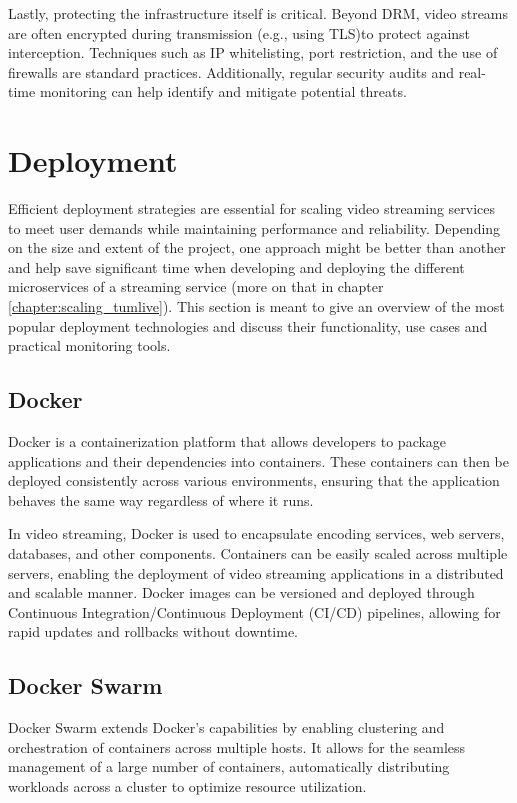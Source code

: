 Lastly, protecting the infrastructure itself is critical. Beyond DRM, video streams are often encrypted during transmission (e.g., using \ac{TLS})to protect against interception. Techniques such as IP whitelisting, port restriction, and the use of firewalls are standard practices. Additionally, regular security audits and real-time monitoring can help identify and mitigate potential threats\cite{network_security}.

\section{Deployment}
Efficient deployment strategies are essential for scaling video streaming services to meet user demands while maintaining performance and reliability. Depending on the size and extent of the project, one approach might be better than another and help save significant time when developing and deploying the different microservices of a streaming service (more on that in chapter \ref{chapter:scaling_tumlive}). This section is meant to give an overview of the most popular deployment technologies and discuss their functionality, use cases and practical monitoring tools.

\subsection{Docker}
Docker is a containerization platform that allows developers to package applications and their dependencies into containers. These containers can then be deployed consistently across various environments, ensuring that the application behaves the same way regardless of where it runs.

In video streaming, Docker is used to encapsulate encoding services, web servers, databases, and other components. Containers can be easily scaled across multiple servers, enabling the deployment of video streaming applications in a distributed and scalable manner. Docker images can be versioned and deployed through Continuous Integration/Continuous Deployment (CI/CD) pipelines, allowing for rapid updates and rollbacks without downtime\cite{docker_deployment}.

\subsection{Docker Swarm}
Docker Swarm extends Docker's capabilities by enabling clustering and orchestration of containers across multiple hosts. It allows for the seamless management of a large number of containers, automatically distributing workloads across a cluster to optimize resource utilization.

